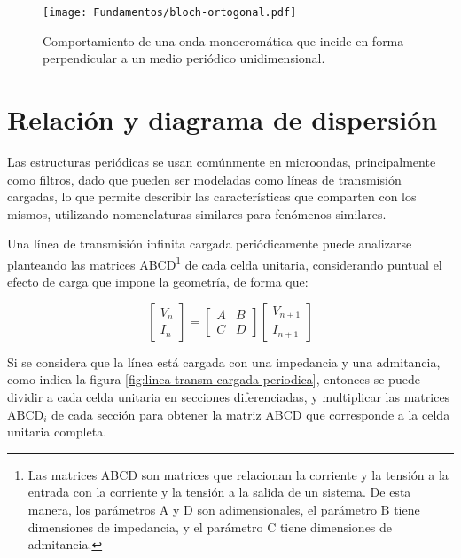 \begin{figure}[htp]
	\centering
	\texttt{[image: Fundamentos/bloch-ortogonal.pdf]}
	\caption{Comportamiento de una onda monocromática que incide en forma perpendicular a un medio periódico unidimensional.}
	\label{fig:bloch-ortogonal}
\end{figure}


\section{Relación y diagrama de dispersión}
\label{sec:diag-de-dispersion}

Las estructuras periódicas se usan comúnmente en microondas, principalmente como filtros, dado que pueden ser modeladas como líneas de transmisión cargadas, lo que permite describir las características que comparten con los mismos, utilizando nomenclaturas similares para fenómenos similares.

Una línea de transmisión infinita cargada periódicamente puede analizarse planteando las matrices ABCD\footnote{Las matrices ABCD son matrices que relacionan la corriente y la tensión a la entrada con la corriente y la tensión a la salida de un sistema. De esta manera, los parámetros A y D son adimensionales, el parámetro B tiene dimensiones de impedancia, y el parámetro C tiene dimensiones de admitancia.} de cada celda unitaria, considerando puntual el efecto de carga que impone la geometría, de forma que:

\begin{equation}
	\begin{bmatrix}
		V_n \\
		I_n
	\end{bmatrix}
	=
	\begin{bmatrix}
		A & B \\
		C & D
	\end{bmatrix}
	\begin{bmatrix}
		V_{n+1} \\
		I_{n+1}
	\end{bmatrix}
\end{equation}

Si se considera que la línea está cargada con una impedancia y una admitancia, como indica la figura \ref{fig:linea-transm-cargada-periodica}, entonces se puede dividir a cada celda unitaria en secciones diferenciadas, y multiplicar las matrices $\text{ABCD}_{i}$ de cada sección para obtener la matriz ABCD que corresponde a la celda unitaria completa.

